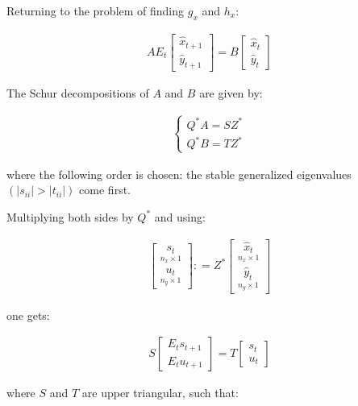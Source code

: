 \documentclass{pracamgr}
\numberwithin{equation}{section}
\begin{document}
Returning to the problem of finding $g_x$ and $h_x$:

\begin{eqnarray}
    A E_t \begin{bmatrix} \widehat{x}_{t+1} \\ \widehat{y}_{t+1} \end{bmatrix} = B\begin{bmatrix} \widehat{x}_t\\ \widehat{y}_t \end{bmatrix}
  \end{eqnarray}

The Schur decompositions of $A$ and $B$ are given by:

\begin{align}
\left\{
\begin{array}{cl}
Q^* A = S Z^* \\
Q^* B = T Z^*
\end{array}
\right.
\end{align}

where the following order is chosen: the stable generalized eigenvalues $(|s_{ii}|>|t_{ii}|)$ come first. 

Multiplying both sides by $Q^*$ and using:

\begin{align}
\begin{bmatrix} \underset{n_x \times 1}{s_t} \\ \underset{n_y\times1}{u_t} \end{bmatrix} : = Z^* \begin{bmatrix} \underset{n_x \times 1}{\widehat{x}_t} \\ \underset{n_y \times 1}{\widehat{y}_t} \end{bmatrix}\end{align}

one gets:

\begin{align}
  S  \begin{bmatrix} E_t s_{t+1}\\ E_t u_{t+1} \end{bmatrix} = T \begin{bmatrix} s_t \\ u_t \end{bmatrix}
\end{align}

where $S$ and $T$ are upper triangular, such that:
\end{document}
